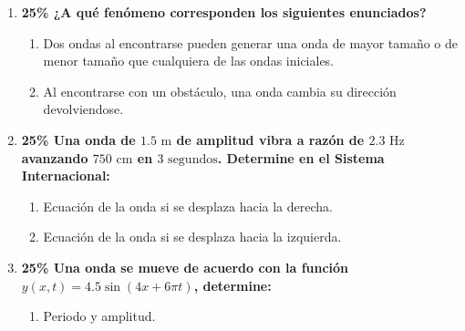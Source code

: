 \documentclass[11pt, letterpaper]{article}
\newif\ifshowanswers
\newcommand{\answer}[1]{ 
	\ifshowanswers 
	\par\vspace{0.15cm} 
	{\color{blue!80!black}\small\textbf{Solución:} #1} 
	\par\vspace{0.15cm} 
	\else 
	\par\vspace{0.3cm} 
	\fi 
}
\begin{document}
	\begin{enumerate}[leftmargin=*, itemsep=0.8cm] 
		
		\item \textbf{25\% \quad ¿A qué fenómeno corresponden los siguientes enunciados?} 
		\begin{enumerate}[label=\alph*., itemsep=0.4cm, leftmargin=0.8cm] 
			\item Dos ondas al encontrarse pueden generar una onda de mayor tamaño o de menor tamaño que cualquiera de las ondas iniciales. \underline{\hspace{6cm}} 
			\answer{\textbf{Interferencia} (constructiva o destructiva).} 
			
			\item Al encontrarse con un obstáculo, una onda cambia su dirección devolviendose.\\
			 \underline{\hspace{6cm}} 
			\answer{\textbf{Reflexión}} 
		\end{enumerate} 
		
		\item \textbf{25\% \quad Una onda de $1.5\text{ m}$ de amplitud vibra a razón de $2.3\text{ Hz}$ avanzando $750\text{ cm}$ en $3\text{ segundos}$. Determine en el Sistema Internacional:} 
		\begin{enumerate}[label=\alph*., itemsep=0.4cm, leftmargin=0.8cm] 
			\item Ecuación de la onda si se desplaza hacia la derecha. 
			\answer{ Datos: $A = 1.5\text{ m}$, $f = 2.3\text{ Hz} \implies \omega = 2\pi f = 4.6\pi\text{ rad/s} \approx 14.45\text{ rad/s}$.\\ 
				Velocidad: $v = \frac{7.5\text{ m}}{3\text{ s}} = 2.5\text{ m/s}$.\\ 
				Longitud de onda: $\lambda = \frac{v}{f} = \frac{2.5}{2.3} \approx 1.087\text{ m} \implies k = \frac{2\pi}{\lambda} = 1.84\pi\text{ rad/m} \approx 5.78\text{ rad/m}$.\\ 
				Ecuación hacia la derecha: $y(x,t) = 1.5 \sin(1.84\pi x - 4.6\pi t)$ \quad (o $y(x,t) = 1.5 \sin(5.78 x - 14.45 t)$). } 
			
			\item Ecuación de la onda si se desplaza hacia la izquierda. 
			\answer{ Ecuación hacia la izquierda: $y(x,t) = 1.5 \sin(1.84\pi x + 4.6\pi t)$ \quad (o $y(x,t) = 1.5 \sin(5.78 x + 14.45 t)$). } 
		\end{enumerate} 
		
		\item \textbf{25\% \quad Una onda se mueve de acuerdo con la función $y(x,t) = 4.5 \sin(4x + 6\pi t)$, determine:} 
		\begin{enumerate}[label=\alph*., itemsep=0.4cm, leftmargin=0.8cm] 
			\item Periodo y amplitud. 
			\answer{ Estructura $y(x,t) = A \sin(kx + \omega t)$:\\ 
				$\bullet$ Amplitud $A = \mathbf{4.5\text{ m}}$.\\ 
				$\bullet$ $\omega = 6\pi\text{ rad/s} \implies T = \frac{2\pi}{\omega} = \frac{2\pi}{6\pi} = \mathbf{\frac{1}{3}\text{ s}} \approx \mathbf{0.33\text{ s}}$. } 
			

\end{enumerate}
\end{enumerate}
\end{document}
